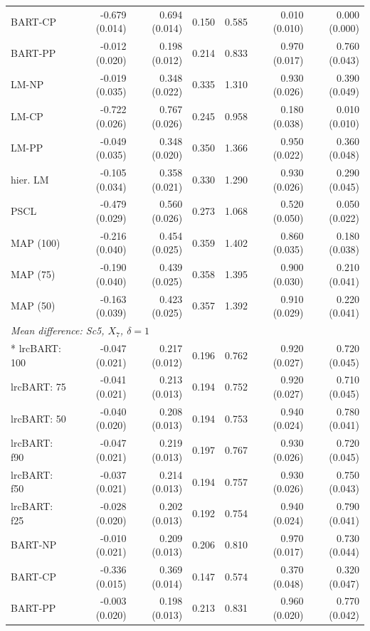 \begin{landscape}
\begin{longtable}{lrrrrrr}
BART-CP & -0.679 (0.014) & 0.694 (0.014) & 0.150 & 0.585 & 0.010 (0.010) & 0.000 (0.000) \\
BART-PP & -0.012 (0.020) & 0.198 (0.012) & 0.214 & 0.833 & 0.970 (0.017) & 0.760 (0.043) \\
LM-NP & -0.019 (0.035) & 0.348 (0.022) & 0.335 & 1.310 & 0.930 (0.026) & 0.390 (0.049) \\
LM-CP & -0.722 (0.026) & 0.767 (0.026) & 0.245 & 0.958 & 0.180 (0.038) & 0.010 (0.010) \\
LM-PP & -0.049 (0.035) & 0.348 (0.020) & 0.350 & 1.366 & 0.950 (0.022) & 0.360 (0.048) \\
hier. LM & -0.105 (0.034) & 0.358 (0.021) & 0.330 & 1.290 & 0.930 (0.026) & 0.290 (0.045) \\
PSCL & -0.479 (0.029) & 0.560 (0.026) & 0.273 & 1.068 & 0.520 (0.050) & 0.050 (0.022) \\
MAP (100) & -0.216 (0.040) & 0.454 (0.025) & 0.359 & 1.402 & 0.860 (0.035) & 0.180 (0.038) \\
MAP (75) & -0.190 (0.040) & 0.439 (0.025) & 0.358 & 1.395 & 0.900 (0.030) & 0.210 (0.041) \\
MAP (50) & -0.163 (0.039) & 0.423 (0.025) & 0.357 & 1.392 & 0.910 (0.029) & 0.220 (0.041) \\
\multicolumn{7}{l}{\strut\textit{Mean difference: Sc5, $X_7$, $\delta=1$}}\\*
lrcBART: 100 & -0.047 (0.021) & 0.217 (0.012) & 0.196 & 0.762 & 0.920 (0.027) & 0.720 (0.045) \\
lrcBART: 75 & -0.041 (0.021) & 0.213 (0.013) & 0.194 & 0.752 & 0.920 (0.027) & 0.710 (0.045) \\
lrcBART: 50 & -0.040 (0.020) & 0.208 (0.013) & 0.194 & 0.753 & 0.940 (0.024) & 0.780 (0.041) \\
lrcBART: f90 & -0.047 (0.021) & 0.219 (0.013) & 0.197 & 0.767 & 0.930 (0.026) & 0.720 (0.045) \\
lrcBART: f50 & -0.037 (0.021) & 0.214 (0.013) & 0.194 & 0.757 & 0.930 (0.026) & 0.750 (0.043) \\
lrcBART: f25 & -0.028 (0.020) & 0.202 (0.013) & 0.192 & 0.754 & 0.940 (0.024) & 0.790 (0.041) \\
BART-NP & -0.010 (0.021) & 0.209 (0.013) & 0.206 & 0.810 & 0.970 (0.017) & 0.730 (0.044) \\
BART-CP & -0.336 (0.015) & 0.369 (0.014) & 0.147 & 0.574 & 0.370 (0.048) & 0.320 (0.047) \\
BART-PP & -0.003 (0.020) & 0.198 (0.013) & 0.213 & 0.831 & 0.960 (0.020) & 0.770 (0.042) \\

\end{longtable}
\end{landscape}
